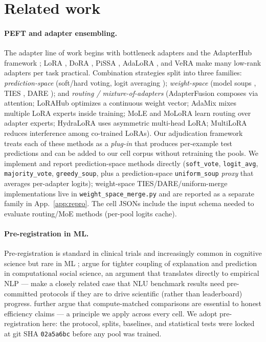 \documentclass[11pt]{article}
\begin{document}
\section{Related work}
\label{sec:related}

\paragraph{PEFT and adapter ensembling.} The adapter line of work begins with bottleneck adapters \citep{houlsby2019parameter} and the AdapterHub framework \citep{pfeiffer2020adapterhub}; LoRA \citep{hu2021lora}, DoRA \citep{dora}, PiSSA \citep{pissa}, AdaLoRA \citep{adalora}, and VeRA \citep{vera} make many low-rank adapters per task practical. Combination strategies split into three families: \emph{prediction-space} (soft/hard voting, logit averaging \citep{lakshminarayanan2017simple}); \emph{weight-space} (model soups \citep{wortsman2022model}, TIES \citep{yadav2023ties}, DARE \citep{yu2024dare}); and \emph{routing / mixture-of-adapters} (AdapterFusion \citep{pfeiffer2021adapterfusion} composes via attention; LoRAHub \citep{huang2023lorahub} optimizes a continuous weight vector; AdaMix \citep{adamix} mixes multiple LoRA experts inside training; MoLE \citep{mole} and MoLoRA \citep{molora} learn routing over adapter experts; HydraLoRA \citep{hydralora} uses asymmetric multi-head LoRA; MultiLoRA \citep{multilora} reduces interference among co-trained LoRAs). Our adjudication framework treats each of these methods as a \emph{plug-in} that produces per-example test predictions and can be added to our cell corpus without retraining the pools. We implement and report prediction-space methods directly (\texttt{soft\_vote}, \texttt{logit\_avg}, \texttt{majority\_vote}, \texttt{greedy\_soup}, plus a prediction-space \texttt{uniform\_soup} \emph{proxy} that averages per-adapter logits); weight-space TIES/DARE/uniform-merge implementations live in \texttt{weight\_\allowbreak space\_\allowbreak merge.\allowbreak py} and are reported as a separate family in App.~\ref{app:repro}. The cell JSONs include the input schema needed to evaluate routing/MoE methods (per-pool logits cache).


\paragraph{Pre-registration in ML.} Pre-registration is standard in clinical trials and increasingly common in cognitive science but rare in ML \citep{munafo2017manifesto, loken2017measurement}; \citet{hofman2021integrating} argue for tighter coupling of explanation and prediction in computational social science, an argument that translates directly to empirical NLP --- \citet{bowman2021will} make a closely related case that NLU benchmark results need pre-committed protocols if they are to drive scientific (rather than leaderboard) progress. \citet{dehghani2022efficiency} further argue that compute-matched comparisons are essential to honest efficiency claims --- a principle we apply across every cell. We adopt pre-registration here: the protocol, splits, baselines, and statistical tests were locked at git SHA \texttt{02a5a6bc} before any pool was trained.
\end{document}

